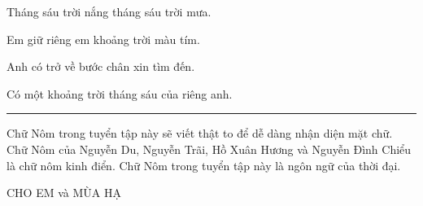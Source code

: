 \documentclass[14pt,a4paper]{extarticle}
\begin{document}
\begin{flushright}

Tháng sáu trời nắng tháng sáu trời mưa. 

Em giữ riêng em khoảng trời màu tím. 

Anh có trở về bước chân xin tìm đến. 

Có một khoảng trời tháng sáu của riêng anh.\bigskip 

{\color{magenta}

\em{}\em{}

\ANH{}\xin{}

\ANH}

\vfill 
\hrule \smallskip 

Chữ Nôm trong tuyển tập này sẽ viết thật to để dễ dàng nhận diện mặt chữ. Chữ Nôm của Nguyễn Du, Nguyễn Trãi, Hồ Xuân Hương và Nguyễn Đình Chiểu là chữ nôm  kinh điển. Chữ Nôm trong tuyển tập này là ngôn ngữ của thời đại.
%
%
%
%
%
%
%
\end{flushright}


\newpage 




\small 

CHO EM và MÙA HẠ\\[1ex]
{\huge \cho \em {}  }\\[1ex]
\bigskip 
\end{document}
